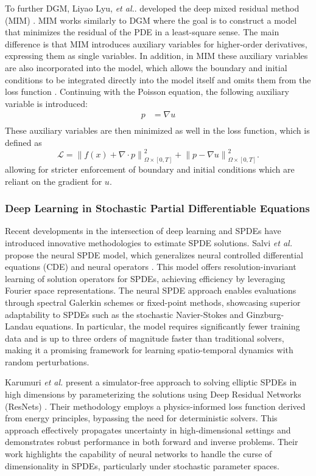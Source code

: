 To further DGM, Liyao Lyu, \textit{et al.}. developed  the deep mixed residual method (MIM) \cite{MIM-PDE-NN}. MIM works similarly to DGM where the goal is to construct a model that minimizes the residual of the PDE in a least-square sense. The main difference is that MIM introduces auxiliary variables for higher-order derivatives, expressing them as single variables. In addition, in MIM these auxiliary variables are also incorporated into the model, which allows the boundary and initial conditions to be integrated directly into the model itself and omits them from the loss function \cite{mim-cont}. Continuing with the Poisson equation, the following auxiliary variable is introduced:
\begin{align*}   
    p &= \nabla u \\
\end{align*}
These auxiliary variables are then minimized as well in the loss function, which is defined as
\begin{equation*}
    \mathcal{L} = \left\| f(x) + \nabla \cdot p \right\|^2_{\Omega \times [0,T]} +\left\| p - \nabla u \right\|^2_{\Omega \times [0,T]}.
\end{equation*}
allowing for stricter enforcement of boundary and initial conditions which are reliant on the gradient for \(u\). 

\subsubsection{Deep Learning in Stochastic Partial Differentiable Equations}
Recent developments in the intersection of deep learning and SPDEs have introduced innovative methodologies to estimate SPDE solutions. Salvi \textit{et al.} propose the neural SPDE model, which generalizes neural controlled differential equations (CDE) and neural operators \cite{nn-spde-3}. This model offers resolution-invariant learning of solution operators for SPDEs, achieving efficiency by leveraging Fourier space representations. The neural SPDE approach enables evaluations through spectral Galerkin schemes or fixed-point methods, showcasing superior adaptability to SPDEs such as the stochastic Navier-Stokes and Ginzburg-Landau equations. In particular, the model requires significantly fewer training data and is up to three orders of magnitude faster than traditional solvers, making it a promising framework for learning spatio-temporal dynamics with random perturbations.

Karumuri \textit{et al.} present a simulator-free approach to solving elliptic SPDEs in high dimensions by parameterizing the solutions using Deep Residual Networks (ResNets) \cite{nn-spde-4}. Their methodology employs a physics-informed loss function derived from energy principles, bypassing the need for deterministic solvers. This approach effectively propagates uncertainty in high-dimensional settings and demonstrates robust performance in both forward and inverse problems. Their work highlights the capability of neural networks to handle the curse of dimensionality in SPDEs, particularly under stochastic parameter spaces.

